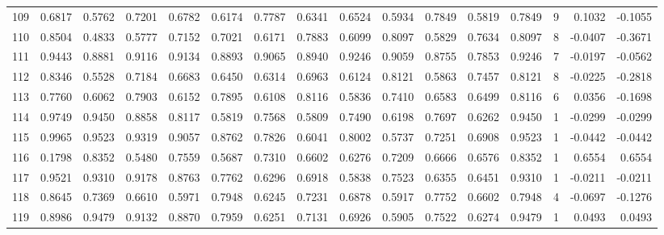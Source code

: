 \begin{tabular}{lrrrrrrrrrrrrrrr}
109 &      0.6817 &  0.5762 &  0.7201 &  0.6782 &  0.6174 &  0.7787 &  0.6341 &  0.6524 &  0.5934 &  0.7849 &   0.5819 &     0.7849 &      9 &                    0.1032 &                    -0.1055 \\
110 &      0.8504 &  0.4833 &  0.5777 &  0.7152 &  0.7021 &  0.6171 &  0.7883 &  0.6099 &  0.8097 &  0.5829 &   0.7634 &     0.8097 &      8 &                   -0.0407 &                    -0.3671 \\
111 &      0.9443 &  0.8881 &  0.9116 &  0.9134 &  0.8893 &  0.9065 &  0.8940 &  0.9246 &  0.9059 &  0.8755 &   0.7853 &     0.9246 &      7 &                   -0.0197 &                    -0.0562 \\
112 &      0.8346 &  0.5528 &  0.7184 &  0.6683 &  0.6450 &  0.6314 &  0.6963 &  0.6124 &  0.8121 &  0.5863 &   0.7457 &     0.8121 &      8 &                   -0.0225 &                    -0.2818 \\
113 &      0.7760 &  0.6062 &  0.7903 &  0.6152 &  0.7895 &  0.6108 &  0.8116 &  0.5836 &  0.7410 &  0.6583 &   0.6499 &     0.8116 &      6 &                    0.0356 &                    -0.1698 \\
114 &      0.9749 &  0.9450 &  0.8858 &  0.8117 &  0.5819 &  0.7568 &  0.5809 &  0.7490 &  0.6198 &  0.7697 &   0.6262 &     0.9450 &      1 &                   -0.0299 &                    -0.0299 \\
115 &      0.9965 &  0.9523 &  0.9319 &  0.9057 &  0.8762 &  0.7826 &  0.6041 &  0.8002 &  0.5737 &  0.7251 &   0.6908 &     0.9523 &      1 &                   -0.0442 &                    -0.0442 \\
116 &      0.1798 &  0.8352 &  0.5480 &  0.7559 &  0.5687 &  0.7310 &  0.6602 &  0.6276 &  0.7209 &  0.6666 &   0.6576 &     0.8352 &      1 &                    0.6554 &                     0.6554 \\
117 &      0.9521 &  0.9310 &  0.9178 &  0.8763 &  0.7762 &  0.6296 &  0.6918 &  0.5838 &  0.7523 &  0.6355 &   0.6451 &     0.9310 &      1 &                   -0.0211 &                    -0.0211 \\
118 &      0.8645 &  0.7369 &  0.6610 &  0.5971 &  0.7948 &  0.6245 &  0.7231 &  0.6878 &  0.5917 &  0.7752 &   0.6602 &     0.7948 &      4 &                   -0.0697 &                    -0.1276 \\
119 &      0.8986 &  0.9479 &  0.9132 &  0.8870 &  0.7959 &  0.6251 &  0.7131 &  0.6926 &  0.5905 &  0.7522 &   0.6274 &     0.9479 &      1 &                    0.0493 &                     0.0493 \\

\end{tabular}
